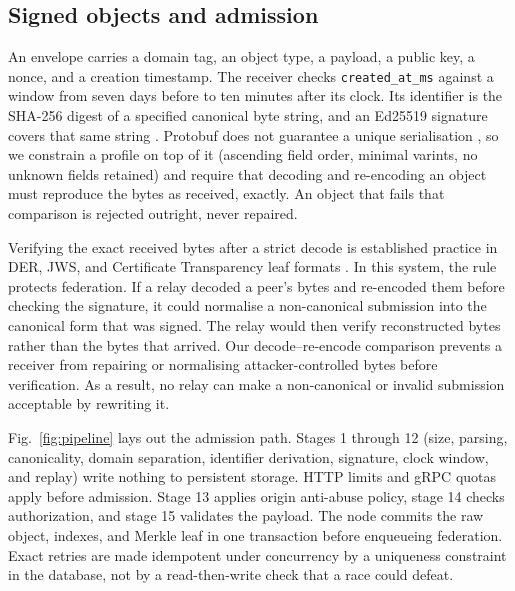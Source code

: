 \documentclass[conference,a4paper,10pt]{IEEEtran}
\begin{document}
\subsection{Signed objects and admission}

An envelope carries a domain tag, an object type, a payload, a public key, a
nonce, and a creation timestamp. The receiver checks \texttt{created\_at\_ms} against a window from seven days before to ten minutes after its clock. Its identifier is the SHA-256 digest of a specified
canonical byte string, and an Ed25519 signature covers that same string
\cite{bernstein2012ed25519}. Protobuf does not guarantee a unique
serialisation \cite{protobufnotcanonical}, so we constrain a profile on top of
it (ascending field order, minimal varints, no unknown fields retained) and require that decoding and re-encoding an object
must reproduce the bytes as received, exactly. An object that fails that
comparison is rejected outright, never repaired.

Verifying the exact received bytes after a strict decode is established practice in DER, JWS, and Certificate Transparency leaf formats \cite{rfc9162}. In this system, the rule protects federation. If a relay decoded a peer’s bytes and re-encoded them before checking the signature, it could normalise a non-canonical submission into the canonical form that was signed. The relay would then verify reconstructed bytes rather than the bytes that arrived. Our decode–re-encode comparison prevents a receiver from repairing or normalising attacker-controlled bytes before verification. As a result, no relay can make a non-canonical or invalid submission acceptable by rewriting it.

Fig.~\ref{fig:pipeline} lays out the admission path. Stages 1 through 12 (size, parsing, canonicality, domain separation, identifier derivation, signature, clock window, and replay) write nothing to persistent
storage. HTTP limits and gRPC quotas apply before admission. Stage 13 applies origin anti-abuse policy, stage 14 checks authorization, and stage 15 validates the payload. The node commits the raw object, indexes, and Merkle leaf in one transaction before enqueueing federation. Exact retries are made idempotent under concurrency by a
uniqueness constraint in the database, not by a read-then-write check that a
race could defeat.
\end{document}
